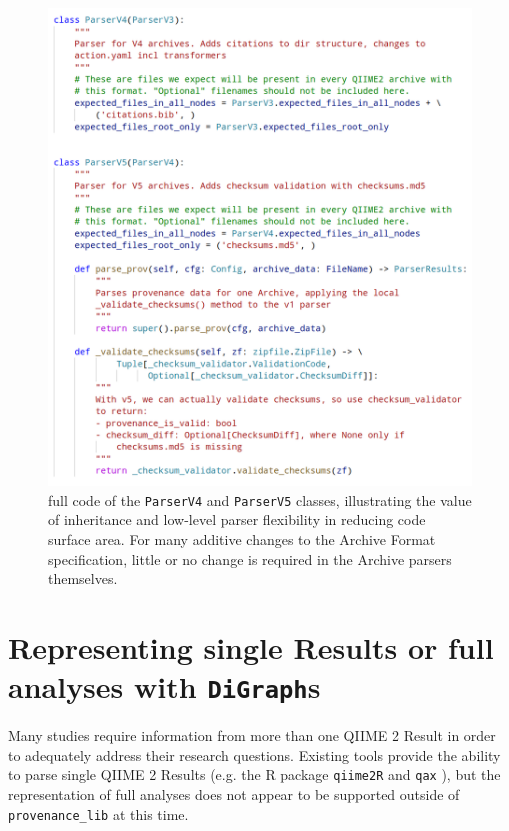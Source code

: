 \begin{figure}[htp]
\centering
\includegraphics[width=\textwidth]{figures/parserCodeBlock2}
\caption[Code snippet illustrating the value of inheritance to ArchiveParser Versions]%
{full code of the \texttt{ParserV4} and \texttt{ParserV5} classes, illustrating the value of
inheritance and low-level parser flexibility in reducing code surface area.
For many additive changes to the Archive Format specification, little or no
change is required in the Archive parsers themselves.}
\label{fig:parserCodeBlock}
\end{figure}


\section{Representing single Results or full analyses with \texttt{DiGraph}s}
\label{section:rep_full_analyses}

Many studies require information from more than one QIIME 2 Result in order to
adequately address their research questions. Existing tools provide the ability to
parse single QIIME 2 Results (e.g. the R package \texttt{qiime2R}
\parencite{bisanz_tutorial_2018} and \texttt{qax} \parencite{telatin_qiime_2021}),
but the representation of full analyses does not appear to be supported outside
of \texttt{provenance\_lib} at this time.

